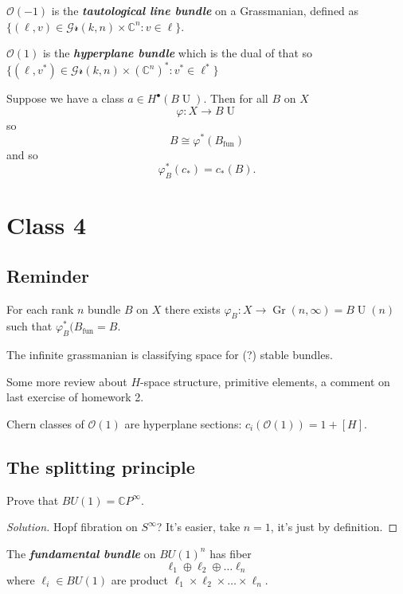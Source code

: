 \begin{remark}
	$\mathcal{O}(-1)$ is the \textit{\textbf{tautological line bundle}} on a Grassmanian, defined as  $\{(\ell,v)\in\mathcal{Gr}(k,n)\times \mathbb{C}^n:v\in\ell\}$.

	$\mathcal{O}(1)$ is the \textit{\textbf{hyperplane bundle}} which is the dual of that so $\{(\ell,v^* )\in\mathcal{Gr}(k,n)\times (\mathbb{C}^n)^*:v^*\in\ell^*\}$
\end{remark}

Suppose we have a class $a\in H^{\bullet}(B\operatorname{U})$. Then for all $B$ on $X$ 
\[\varphi:X\to B\operatorname{U}\]
so
\[B\cong \varphi^* (B_{\operatorname{fun}})\]
and so
\[\varphi^*_B(c_*)=c_*(B).\]





\section{Class 4}

\subsection{Reminder}

For each rank $n$ bundle $B$ on $X$ there exists $\varphi_B:X\to \operatorname{Gr}(n,\infty)=B\operatorname{U}(n)$ such that $\varphi^* _B(B_{\operatorname{f un}}=B$.

The infinite grassmanian is classifying space for (?) stable bundles.

Some more review about $H$-space structure, primitive elements, a comment on last exercise of homework 2.

Chern classes of $\mathcal{O}(1)$ are hyperplane sections: $c_i(\mathcal{O}(1))=1+[H]$.

\subsection{The splitting principle}

\begin{exercise}
	Prove that $BU(1)=\mathbb{C}P^\infty$.
\end{exercise}

\begin{proof}[Solution]\leavevmode
	Hopf fibration on $S^\infty$? It's easier, take $n=1$, it's just by  definition.
\end{proof}

\begin{defn}
	The \textit{\textbf{fundamental bundle}} on $BU(1)^n$ has fiber
	\[\ell_1\oplus \ell_2\oplus \ldots\ell_n\]
	where $\ell_i\in BU(1)$ are product $\ell_1\times \ell_2\times \ldots\times \ell_n$.
\end{defn}

